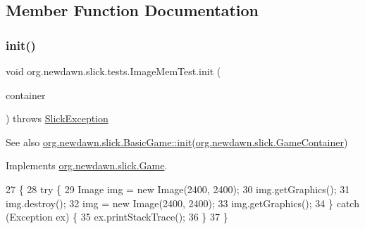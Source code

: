 \subsection{Member Function Documentation}
\mbox{\label{classorg_1_1newdawn_1_1slick_1_1tests_1_1_image_mem_test_ab1c711f13e9306b417fed9d190bf04f4}} 
\subsubsection{\texorpdfstring{init()}{init()}}
{\footnotesize\ttfamily void org.\+newdawn.\+slick.\+tests.\+Image\+Mem\+Test.\+init (\begin{DoxyParamCaption}\item[{\mbox{\hyperlink{classorg_1_1newdawn_1_1slick_1_1_game_container}{Game\+Container}}}]{container }\end{DoxyParamCaption}) throws \mbox{\hyperlink{classorg_1_1newdawn_1_1slick_1_1_slick_exception}{Slick\+Exception}}\hspace{0.3cm}{\ttfamily [inline]}}

\begin{DoxySeeAlso}{See also}
\mbox{\hyperlink{classorg_1_1newdawn_1_1slick_1_1_basic_game_a8af0900217e4d389249f71367b22d114}{org.\+newdawn.\+slick.\+Basic\+Game\+::init}}(\mbox{\hyperlink{classorg_1_1newdawn_1_1slick_1_1_game_container}{org.\+newdawn.\+slick.\+Game\+Container}}) 
\end{DoxySeeAlso}


Implements \mbox{\hyperlink{interfaceorg_1_1newdawn_1_1slick_1_1_game_ad2dd6affab08bb8fdb5fab0815957b7a}{org.\+newdawn.\+slick.\+Game}}.


\begin{DoxyCode}
27                                                                     \{
28         \textcolor{keywordflow}{try} \{
29             Image img = \textcolor{keyword}{new} Image(2400, 2400);
30             img.getGraphics();
31             img.destroy();
32             img = \textcolor{keyword}{new} Image(2400, 2400);
33             img.getGraphics();
34         \} \textcolor{keywordflow}{catch} (Exception ex) \{
35             ex.printStackTrace();
36         \}
37     \}
\end{DoxyCode}
\mbox{\label{classorg_1_1newdawn_1_1slick_1_1tests_1_1_image_mem_test_a135897312e2c9c9ca7465ceb70a0abc4}} 
